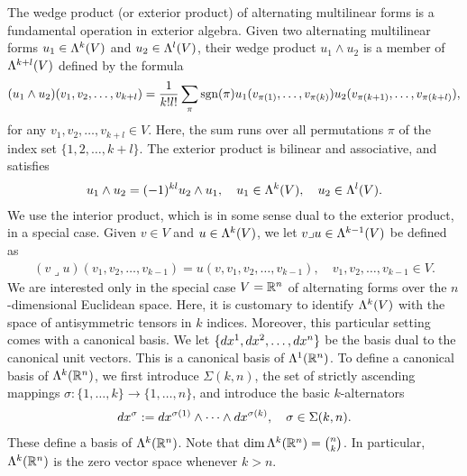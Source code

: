 \documentclass[12pt,a4paper]{article}
\begin{document}
The wedge product (or exterior product) of alternating multilinear forms is a fundamental operation in exterior algebra. 
Given two alternating multilinear forms \( u_1 \in \Lambda^{k}(V) \) and \( u_2 \in \Lambda^{l}(V) \), 
their wedge product \( u_1 \wedge u_2 \) is a member of $\Lambda^{k+l}(V)$
defined by the formula 
\[
    (u_1 \wedge u_2)(v_1, v_2, \ldots, v_{k+l}) 
    = 
    \frac{1}{k! l!} 
    \sum_{ \pi } 
    \operatorname{sgn}(\pi) 
    u_1( v_{\pi(  1)}, \ldots, v_{\pi(k  )} ) 
    u_2( v_{\pi(k+1)}, \ldots, v_{\pi(k+l)} ),
\]
for any \( v_1, v_2, \ldots, v_{k+l} \in V \).
Here, the sum runs over all permutations $\pi$ of the index set \(\{ 1, 2, \ldots, k+l \}\).
The exterior product is bilinear and associative, and satisfies 
\begin{align*}
    u_1 \wedge u_2 = (-1)^{kl} u_2 \wedge u_1,
    \quad 
    u_1 \in \Lambda^{k}(V),
    \quad 
    u_2 \in \Lambda^{l}(V).
\end{align*}
We use the interior product, which is in some sense dual to the exterior product, in a special case. Given $v \in V$ and $u \in \Lambda^{k}(V)$, we let $v \lrcorner u \in \Lambda^{k-1}(V)$ be defined as 
\begin{align*}
    (v \lrcorner u)( v_1, v_2, \ldots, v_{k-1} ) = u( v, v_1, v_2, \ldots, v_{k-1} ),
    \quad 
    v_1, v_2, \ldots, v_{k-1} \in V.
\end{align*}
We are interested only in the special case $V = {\mathbb R}^{n}$ of alternating forms over the $n$-dimensional Euclidean space. 
Here, it is customary to identify $\Lambda^{k}(V)$ with the space of antisymmetric tensors in $k$ indices. 
Moreover, this particular setting comes with a canonical basis. 
We let \(\{dx^1, dx^2, \ldots, dx^{n}\}\) be the basis dual to the canonical unit vectors.
This is a canonical basis of $\Lambda^{1}({\mathbb R}^{n})$. 
To define a canonical basis of $\Lambda^{k}({\mathbb R}^{n})$, 
we first introduce $\Sigma(k,n)$, the set of strictly ascending mappings $\sigma : \{1,\dots,k\} \rightarrow \{1,\dots,n\}$,
and introduce the basic $k$-alternators 
\begin{align*}
    dx^{\sigma} := dx^{\sigma(1)} \wedge \dots \wedge dx^{\sigma(k)}, \quad \sigma \in \Sigma(k,n). 
\end{align*}
These define a basis of $\Lambda^{k}({\mathbb R}^{n})$.
Note that 
$\dim \Lambda^{k}({\mathbb R}^{n}) = \binom{n}{k}$. 
In particular, $\Lambda^{k}({\mathbb R}^{n})$ is the zero vector space whenever $k > n$.
\end{document}
